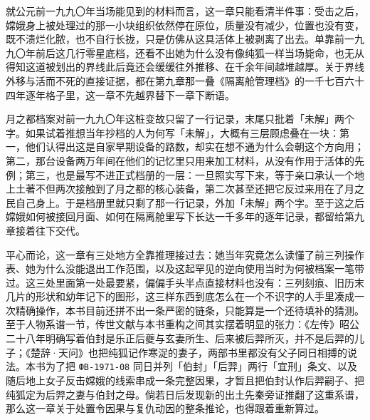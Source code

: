 就公元前一九九〇年当场能见到的材料而言，这一章只能看清半件事：受击之后，嫦娥身上被处理过的那一小块组织依然停在原位，质量没有减少，位置也没有变，既不溃烂化脓，也不自行长拢，只是仿佛从这具活体上被剥离了出去。单靠前一九九〇年前后这几行零星底档，还看不出她为什么没有像纯狐一样当场毙命，也无从得知这道被划出的界线此后竟还会缓缓往外推移、在千余年间越堆越厚。关于界线外移与活而不死的直接证据，都在第九章那一叠《隔离舱管理档》的一千七百六十四年逐年格子里，这一章不先越界替下一章下断语。

月之都档案对前一九九〇年这桩变故只留了一行记录，末尾只批着「未解」两个字。如果试着推想当年抄档的人为何写「未解」，大概有三层顾虑叠在一块：第一，他们认得出这是自家早期设备的路数，却实在想不通为什么会朝这个方向用；第二，那台设备两万年间在他们的记忆里只用来加工材料，从没有作用于活体的先例；第三，也是最写不进正式档册的一层：一旦照实写下来，等于亲口承认一个地上土著不但两次接触到了月之都的核心装备，第二次甚至还把它反过来用在了月之民自己身上。于是档册里就只剩了那一行记录，外加「未解」两个字。至于这之后嫦娥如何被接回月面、如何在隔离舱里写下长达一千多年的逐年记录，都留给第九章接着往下交代。

平心而论，这一章有三处地方全靠推理接过去：她当年究竟怎么读懂了前三列操作表、她为什么没能退出工作范围，以及这起罕见的逆向使用当时为何被档案一笔带过。这三处里面第一处最要紧，偏偏手头半点直接材料也没有：三列刻痕、旧历末几片的形状和幼年记下的图形，这三样东西到底怎么在一个不识字的人手里凑成一次精确操作，本书目前还拼不出一条严密的链条，只能算是一个还待填补的猜测。至于人物系谱一节，传世文献与本书重构之间其实摆着明显的张力：《左传》昭公二十八年明确写着伯封是乐正后夔与玄妻所生、后来被后羿所灭，并不是后羿的儿子；《楚辞·天问》也把纯狐记作寒浞的妻子，两部书里都没有父子同日相搏的说法。本书为了把 \texttt{ФВ-1971-08} 同日并列「伯封」「后羿」两行「宜刑」条文、以及随后地上女子反击嫦娥的线索串成一条完整因果，才暂且把伯封认作后羿嗣子、把纯狐定为后羿之妻与伯封之母。倘若日后发现新的出土先秦旁证推翻了这重系谱，那么这一章关于处置令因果与复仇动因的整条推论，也得跟着重新算过。
